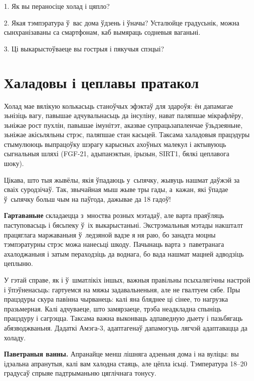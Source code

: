 1. Як вы пераносіце холад і цяпло?

2. Якая тэмпэратура ў~вас дома ўдзень і ўначы? Усталюйце градусьнік, можна сынхранізаваны са смартфонам, каб вымяраць содневыя ваганьні.

3. Ці выкарыстоўваеце вы гострыя і пякучыя спэцыі?


\section{Халадовы і цеплавы пратакол}

Холад мае вялікую колькасьць станоўчых эфэктаў для здароўя: ён дапамагае зьнізіць вагу, павышае адчувальнасьць да інсуліну, нават паляпшае мікрафлёру, зьніжае рост пухлін, павышае імунітэт, аказвае супрацьзапаленчае ўзьдзеяньне, зьніжае акісьляльны стрэс, паляпшае стан касьцей. Таксама халадовыя працэдуры стымулююць выпрацоўку шэрагу карысных ахоўных малекул і актывуюць сыгнальныя шляхі (FGF-21, адыпанэктын, ірызын, SIRT1, бялкі цеплавога шоку).


Цікава, што тыя жывёлы, якія ўпадаюць у~сьпячку, жывуць нашмат даўжэй за сваіх суродзічаў. Так, звычайная мыш жыве тры гады, а~кажан, які ўпадае ў~сьпячку больш чым на паўгода, дажывае да 18 гадоў!

\textbf{Гартаваньне} складаецца з~мноства розных мэтадаў, але варта праяўляць паступовасьць і бясьпеку ў~іх выкарыстаньні. Экстрэмальныя мэтады накшталт працяглага маржаваньня ў~ледзяной вадзе я ня раю, бо занадта моцны тэмпэратурны стрэс можа нанесьці шкоду. Пачынаць варта з~паветранага ахалоджаньня і затым пераходзіць да воднага, бо вада нашмат мацней адводзіць цеплыню.

У гэтай справе, як і ў~шматлікіх іншых, важныя правільны псыхалягічны настрой і ўпэўненасьць: гартуемся на мяжы задавальненьня, але не гвалтуем сябе. Пры працэдуры скура павінна чырванець: калі яна бляднее ці сінее, то нагрузка празьмерная. Калі адчуваеце, што замярзаеце, трэба неадкладна спыніць працэдуру і сагрэцца. Таксама важна выконваць адпаведную дыету і пазьбягаць абязводжваньня. Дадаткі Амэга-3, адаптагенаў дапамогуць лягчэй адаптавацца да холаду.

\textbf{Паветраныя ванны.} Апранайце менш лішняга адзеньня дома і на вуліцы: вы ідэальна апранутыя, калі вам халодна стаяць, але цёпла ісьці. Тэмпература 18--20 градусаў спрыяе падтрыманьню цяглічнага тонусу.


